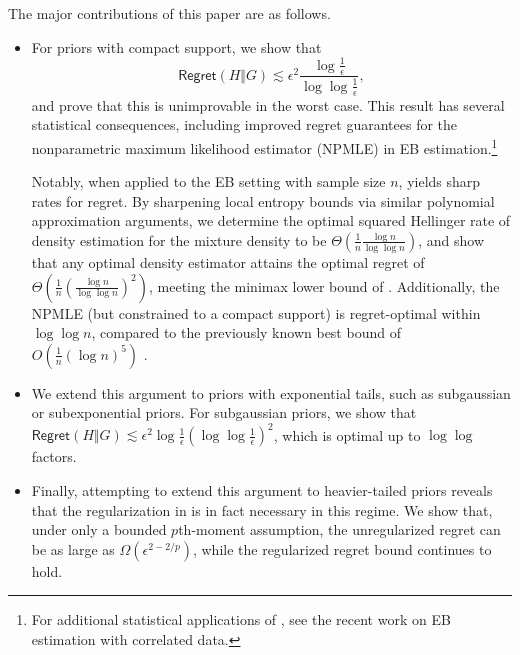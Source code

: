 \documentclass[letterpaper,11pt]{article}
\theoremstyle{definition}
\newcommand{\Regret}{\mathsf{Regret}}
\begin{document}
The major contributions of this paper are as follows.

\begin{itemize}
    \item For priors with compact support, we show that
\begin{equation}    
\Regret(H \Vert G) \lesssim \epsilon^2 \frac{\log \frac{1}{\epsilon}}{\log \log \frac{1}{\epsilon}},
\label{eq:regret-compact-intro}
\end{equation}
and prove that this is unimprovable in the worst case. 
This result has several statistical consequences, including improved regret guarantees for the nonparametric maximum likelihood estimator (NPMLE) in EB estimation.\footnote{For additional statistical applications of , see the recent work \cite{han2026empirical} on EB estimation with correlated data.}

Notably, when applied to the EB setting with sample size $n$, 
 yields sharp rates for regret.
By sharpening local entropy bounds via 
similar polynomial approximation arguments, we determine the optimal squared Hellinger rate of density estimation for the mixture density to be $\Theta(\frac{1}{n}
\frac{\log n}{\log\log n})$, and show that any optimal density estimator attains the optimal regret of $\Theta(\frac{1}{n}
(\frac{\log n}{\log\log n})^2)$, meeting the minimax lower bound of 
\cite{polyanskiy2021sharp}. Additionally, the NPMLE (but
constrained to a compact support) is regret-optimal within $\log \log n$, compared to the
previously known best bound of $O(\frac{1}{n} (\log n)^5)$ \cite{JiangZhang2009}.






\item We extend this argument to priors with exponential tails, such as subgaussian or
subexponential priors. For subgaussian priors, we show that $\Regret(H\Vert G) \lesssim \epsilon^2 \log \frac{1}{\epsilon} (\log \log \frac{1}{\epsilon})^2$, which is optimal up to $\log\log$ factors.

\item Finally, attempting to extend this argument to heavier-tailed priors reveals that
the regularization in \cite{JiangZhang2009} is in fact necessary in this regime. We show
that, under only a bounded $p$th-moment assumption, the unregularized regret can be as
large as $\Omega (\epsilon^ {2-2/p})$, while the regularized regret bound  continues to hold.
\end{itemize}
\end{document}
